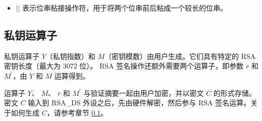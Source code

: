 \documentclass[main\_\_CN.tex]{subfiles}
\begin{document}
\begin{itemize}
    \item 
        \begin{math}{ || }\end{math}  \hspace{1.0cm}        表示位串粘接操作符，用于将两个位串前后粘成一个较长的位串。
\end{itemize}



\subsection{私钥运算子}
\label{sec:digsig-private-key-operands}

私钥运算子 \begin{math}Y\end{math}（私钥指数）和 \begin{math}M\end{math}（密钥模数）由用户生成。它们具有特定的 RSA 密钥长度（最大为 3072 位）。
RSA 签名操作还额外需要两个运算子，即参数 \begin{math}\overline{r}\end{math} 和 \begin{math}M^{\prime}\end{math}，由 \begin{math}Y\end{math} 和 \begin{math}M\end{math} 运算得到。

    
运算子 \begin{math}Y\end{math}、
\begin{math}M\end{math}、
\begin{math}\overline{r}\end{math} 和
\begin{math}M^{\prime}\end{math} 与验证摘要一起由用户加密，并以密文 \begin{math}C\end{math} 的形式存储。密文 \begin{math}C\end{math} 输入到 RSA\_DS 外设之后，先由硬件解密，然后参与 RSA 签名运算。关于如何生成 \begin{math}C\end{math}，请参考章节 \ref{sec:digsig-private-key-operands}。
\end{document}
